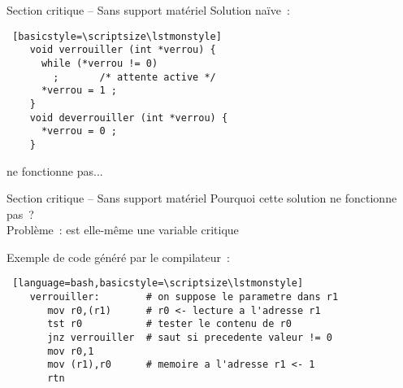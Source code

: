\begin {frame} [fragile] {Section critique -- Sans support matériel}
    Solution naïve~:

    \begin {lstlisting} [basicstyle=\scriptsize\lstmonstyle]
    void verrouiller (int *verrou) {
      while (*verrou != 0)
        ;       /* attente active */
      *verrou = 1 ;
    }
    void deverrouiller (int *verrou) {
      *verrou = 0 ;
    }
    \end{lstlisting}

    \implique ne fonctionne pas...

\end{frame}

\begin {frame} [fragile] {Section critique -- Sans support matériel}
    Pourquoi cette solution ne fonctionne pas~? \\
    Problème~:  est elle-même une variable critique

    \vspace* {3mm}

    Exemple de code généré par le compilateur~:

    \begin {lstlisting} [language=bash,basicstyle=\scriptsize\lstmonstyle]
    verrouiller:        # on suppose le parametre dans r1
       mov r0,(r1)      # r0 <- lecture a l'adresse r1
       tst r0           # tester le contenu de r0
       jnz verrouiller  # saut si precedente valeur != 0
       mov r0,1
       mov (r1),r0      # memoire a l'adresse r1 <- 1
       rtn
    \end{lstlisting}

\end{frame}

